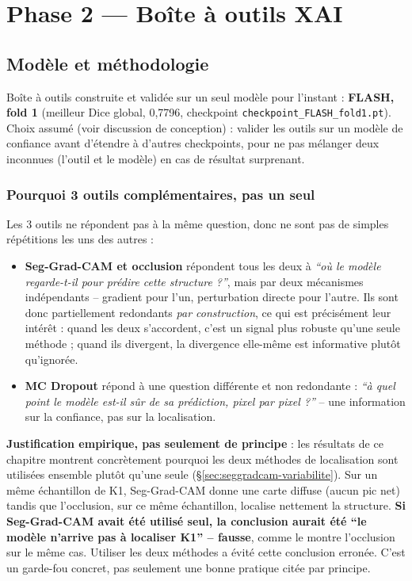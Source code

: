 \documentclass[11pt,a4paper]{report}
\begin{document}
\chapter{Phase 2 --- Boîte à outils XAI}
\label{chap:xai}

\section{Modèle et méthodologie}

Boîte à outils construite et validée sur un seul modèle pour l'instant : \textbf{FLASH,
fold 1} (meilleur Dice global, 0,7796, checkpoint \texttt{checkpoint\_FLASH\_fold1.pt}).
Choix assumé (voir discussion de conception) : valider les outils sur un modèle de
confiance avant d'étendre à d'autres checkpoints, pour ne pas mélanger deux inconnues
(l'outil et le modèle) en cas de résultat surprenant.

\subsection{Pourquoi 3 outils complémentaires, pas un seul}
\label{sec:xai-pourquoi-trois}

Les 3 outils ne répondent pas à la même question, donc ne sont pas de simples
répétitions les uns des autres :

\begin{itemize}[nosep]
    \item \textbf{Seg-Grad-CAM et occlusion} répondent tous les deux à \emph{``où le
        modèle regarde-t-il pour prédire cette structure ?''}, mais par deux
        mécanismes indépendants -- gradient pour l'un, perturbation directe pour
        l'autre. Ils sont donc partiellement redondants \emph{par construction}, ce
        qui est précisément leur intérêt : quand les deux s'accordent, c'est un
        signal plus robuste qu'une seule méthode ; quand ils divergent, la
        divergence elle-même est informative plutôt qu'ignorée.
    \item \textbf{MC Dropout} répond à une question différente et non redondante :
        \emph{``à quel point le modèle est-il sûr de sa prédiction, pixel par
        pixel ?''} -- une information sur la confiance, pas sur la localisation.
\end{itemize}

\textbf{Justification empirique, pas seulement de principe} : les résultats de ce
chapitre montrent concrètement pourquoi les deux méthodes de localisation sont
utilisées ensemble plutôt qu'une seule (\S\ref{sec:seggradcam-variabilite}). Sur un
même échantillon de K1, Seg-Grad-CAM donne une carte diffuse (aucun pic net) tandis
que l'occlusion, sur ce même échantillon, localise nettement la structure.
\textbf{Si Seg-Grad-CAM avait été utilisé seul, la conclusion aurait été ``le modèle
n'arrive pas à localiser K1'' -- fausse}, comme le montre l'occlusion sur le même
cas. Utiliser les deux méthodes a évité cette conclusion erronée. C'est un
garde-fou concret, pas seulement une bonne pratique citée par principe.
\end{document}
